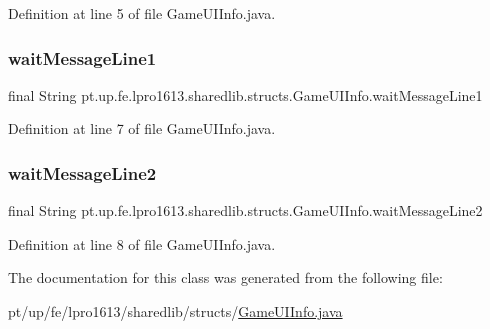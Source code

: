 Definition at line 5 of file Game\+U\+I\+Info.\+java.

\hypertarget{classpt_1_1up_1_1fe_1_1lpro1613_1_1sharedlib_1_1structs_1_1_game_u_i_info_aeae3b5efead23d6a6aa373738460fba2}{}\label{classpt_1_1up_1_1fe_1_1lpro1613_1_1sharedlib_1_1structs_1_1_game_u_i_info_aeae3b5efead23d6a6aa373738460fba2} 
\subsubsection{\texorpdfstring{wait\+Message\+Line1}{waitMessageLine1}}
{\footnotesize\ttfamily final String pt.\+up.\+fe.\+lpro1613.\+sharedlib.\+structs.\+Game\+U\+I\+Info.\+wait\+Message\+Line1}



Definition at line 7 of file Game\+U\+I\+Info.\+java.

\hypertarget{classpt_1_1up_1_1fe_1_1lpro1613_1_1sharedlib_1_1structs_1_1_game_u_i_info_a15c062eb1e6fd3a80cfa706f2e786522}{}\label{classpt_1_1up_1_1fe_1_1lpro1613_1_1sharedlib_1_1structs_1_1_game_u_i_info_a15c062eb1e6fd3a80cfa706f2e786522} 
\subsubsection{\texorpdfstring{wait\+Message\+Line2}{waitMessageLine2}}
{\footnotesize\ttfamily final String pt.\+up.\+fe.\+lpro1613.\+sharedlib.\+structs.\+Game\+U\+I\+Info.\+wait\+Message\+Line2}



Definition at line 8 of file Game\+U\+I\+Info.\+java.



The documentation for this class was generated from the following file\+:\begin{DoxyCompactItemize}
\item 
pt/up/fe/lpro1613/sharedlib/structs/\hyperlink{_game_u_i_info_8java}{Game\+U\+I\+Info.\+java}\end{DoxyCompactItemize}
